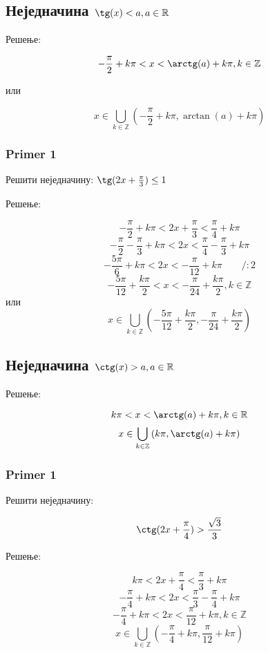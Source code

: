 \documentclass[a4paper,12pt]{article}
\begin{document}
\subsection{Неједначина $\tg(x)<a,a\in\mathbb{R}$}

Решење:

\[-\frac{\pi}{2}+k\pi<x<\arctg(a)+k\pi,k\in\mathbb{Z}\]
\centerline{или}
\[x\in\bigcup_{k\in\mathbb{Z}}\left(-\frac{\pi}{2}+k\pi,\arctan(a)+k\pi\right)\]

\subsubsection{Primer 1}

Решити неједначину: $\tg(2x+\frac{\pi}{3})\le1$

Решење:

\[-\frac{\pi}{2}+k\pi<2x+\frac{\pi}{3}<\frac{\pi}{4}+k\pi\]
\[-\frac{\pi}{2}-\frac{\pi}{3}+k\pi<2x<\frac{\pi}{4}-\frac{\pi}{3}+k\pi\]
\[-\frac{5\pi}{6}+k\pi<2x<-\frac{\pi}{12}+k\pi\qquad/:2\]
\[-\frac{5\pi}{12}+\frac{k\pi}{2}<x<-\frac{\pi}{24}+\frac{k\pi}{2},k\in\mathbb{Z}\]
или
\[x\in\bigcup_{k\in\mathbb{Z}}\left(-\frac{5\pi}{12}+\frac{k\pi}{2},-\frac{\pi}{24}+\frac{k\pi}{2}\right)\]


\subsection{Неједначина $\ctg(x)>a,a\in\mathbb{R}$}

Решење:

\[k\pi<x<\arctg(a)+k\pi,k\in\mathbb{R}\]
\[x\in\bigcup_{k\in\mathbb{Z}}\left(k\pi,\arctg(a)+k\pi\right)\]


\subsubsection{Primer 1}

Решити неједначину:

\[\ctg(2x+\frac{\pi}{4})>\frac{\sqrt{3}}{3}\]

Решење:

\[k\pi<2x+\frac{\pi}{4}<\frac{\pi}{3}+k\pi\]
\[-\frac{\pi}{4}+k\pi<2x<\frac{\pi}{3}-\frac{\pi}{4}+k\pi\]
\[-\frac{\pi}{4}+k\pi<2x<\frac{\pi}{12}+k\pi,k\in\mathbb{Z}\]
\[x\in\bigcup_{k\in\mathbb{Z}}\left(-\frac{\pi}{4}+k\pi,\frac{\pi}{12}+k\pi\right)\]
\end{document}
